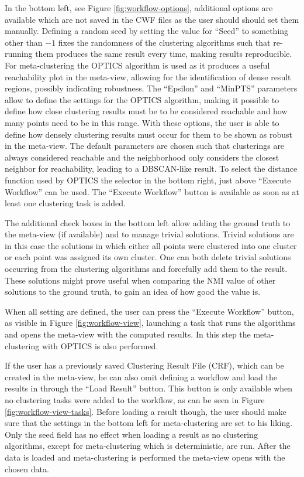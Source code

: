 \documentclass[
	a4paper,
	english,
	twoside,
	openright,               
	11pt                            
	]{report}
\begin{document}
In the bottom left, see Figure \ref{fig:workflow-options}, additional options are available which are not saved in the CWF files as the user should should set them manually. Defining a random seed by setting the value for ``Seed'' to something other than $-1$ fixes the randomness of the clustering algorithms such that re-running them produces the same result every time, making results reproducible. For meta-clustering the OPTICS \cite{10.1145/304181.304187} algorithm is used as it produces a useful reachability plot in the meta-view, allowing for the identification of dense result regions, possibly indicating robustness. The ``Epsilon'' and ``MinPTS'' parameters allow to define the settings for the OPTICS algorithm, making it possible to define how close clustering results must be to be considered reachable and how many points need to be in this range. With these options, the user is able to define how densely clustering results must occur for them to be shown as robust in the meta-view. The default parameters are chosen such that clusterings are always considered reachable and the neighborhood only considers the closest neighbor for reachability, leading to a DBSCAN-like result. To select the distance function used by OPTICS the selector in the bottom right, just above ``Execute Workflow'' can be used. The ``Execute Workflow'' button is available as soon as at least one clustering task is added.

The additional check boxes in the bottom left allow adding the ground truth to the meta-view (if available) and to manage trivial solutions. Trivial solutions are in this case the solutions in which either all points were clustered into one cluster or each point was assigned its own cluster. One can both delete trivial solutions occurring from the clustering algorithms and forcefully add them to the result. These solutions might prove useful when comparing the NMI value of other solutions to the ground truth, to gain an idea of how good the value is.

When all setting are defined, the user can press the ``Execute Workflow'' button, as visible in Figure \ref{fig:workflow-view}, launching a task that runs the algorithms and opens the meta-view with the computed results. In this step the meta-clustering with OPTICS \cite{10.1145/304181.304187} is also performed.

If the user has a previously saved Clustering Result File (CRF), which can be created in the meta-view, he can also omit defining a workflow and load the results in through the ``Load Result'' button. This button is only available when no clustering tasks were added to the workflow, as can be seen in Figure \ref{fig:workflow-view-tasks}. Before loading a result though, the user should make sure that the settings in the bottom left for meta-clustering are set to his liking. Only the seed field has no effect when loading a result as no clustering algorithms, except for meta-clustering which is deterministic, are run. After the data is loaded and meta-clustering is performed the meta-view opens with the chosen data.
\end{document}
